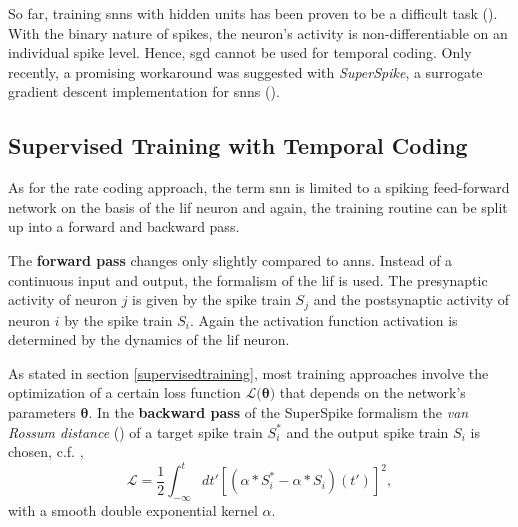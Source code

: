 So far, training \glspl{snn} with hidden units has been proven to be a difficult task (\citealp{pfeiffer2018deep}). With the binary nature of spikes, the neuron's activity is non-differentiable on an individual spike level. Hence, \gls{sgd} cannot be used for temporal coding. Only recently, a promising workaround was suggested with \emph{SuperSpike}, a surrogate gradient descent implementation for \glspl{snn} (\citealp{zenke2018superspike}).

\subsection{Supervised Training with Temporal Coding}
\label{superspike}

As for the rate coding approach, the term \gls{snn} is limited to a spiking feed-forward network on the basis of the \gls{lif} neuron and again, the training routine can be split up into a forward and backward pass.

The \textbf{forward pass} changes only slightly compared to \glspl{ann}. Instead of a continuous input and output, the formalism of the \gls{lif} is used. The presynaptic activity of neuron $j$ is given by the spike train $S_j$ and the postsynaptic activity of neuron $i$ by the spike train $S_i$. Again the activation function \gls{activation} is determined by the dynamics of the \gls{lif} neuron.

As stated in section \ref{supervisedtraining}, most training approaches involve the optimization of a certain loss function $\mathcal{L(\mathbf{\theta)}}$ that depends on the network's parameters $\mathbf{\theta}$. In the \textbf{backward pass} of the SuperSpike formalism the \emph{van Rossum distance} (\citealp{rossum01novel}) of a target spike train $S^*_i$ and the output spike train $S_i$ is chosen, c.f. \citealp{zenke2018superspike},
\begin{equation}
\label{vonrossumdistance}
\mathcal{L} = \frac{1}{2} \int^t_{-\infty}dt' \left[\left(\alpha \ast S^*_i - \alpha \ast S_i \right)(t')\right]^2,
\end{equation}
with a smooth double exponential kernel $\alpha$. 


